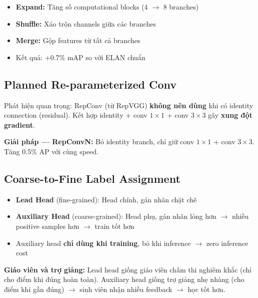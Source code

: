 \begin{itemize}
    \item \textbf{Expand:} Tăng số computational blocks (4 $\rightarrow$ 8 branches)
    \item \textbf{Shuffle:} Xáo trộn channels giữa các branches
    \item \textbf{Merge:} Gộp features từ tất cả branches
    \item Kết quả: +0.7\% mAP so với ELAN chuẩn
\end{itemize}

\subsection{Planned Re-parameterized Conv}
Phát hiện quan trọng: RepConv (từ RepVGG) \textbf{không nên dùng} khi có identity connection (residual). Kết hợp identity + conv $1\times1$ + conv $3\times3$ gây \textbf{xung đột gradient}.

\textbf{Giải pháp --- RepConvN:} Bỏ identity branch, chỉ giữ conv $1\times1$ + conv $3\times3$. Tăng 0.5\% AP với cùng speed.

\subsection{Coarse-to-Fine Label Assignment}
\begin{itemize}
    \item \textbf{Lead Head} (fine-grained): Head chính, gán nhãn chặt chẽ
    \item \textbf{Auxiliary Head} (coarse-grained): Head phụ, gán nhãn lỏng hơn $\rightarrow$ nhiều positive samples hơn $\rightarrow$ train tốt hơn
    \item Auxiliary head \textbf{chỉ dùng khi training}, bỏ khi inference $\rightarrow$ zero inference cost
\end{itemize}

\begin{analogybox}
\textbf{Giáo viên và trợ giảng:} Lead head giống giáo viên chấm thi nghiêm khắc (chỉ cho điểm khi đúng hoàn toàn). Auxiliary head giống trợ giảng nhẹ nhàng (cho điểm khi gần đúng) $\rightarrow$ sinh viên nhận nhiều feedback $\rightarrow$ học tốt hơn.
\end{analogybox}

